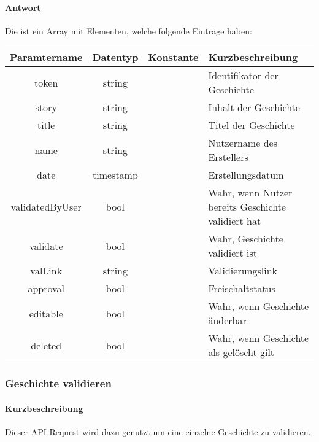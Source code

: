\paragraph{Antwort}Die ist ein Array mit Elementen, welche folgende Einträge haben:
\begin{table}[H]
	\begin{tabular}{|c|c|c|p{6.5cm}|}
		\hline
		\textbf{Paramtername} & \textbf{Datentyp} & \textbf{Konstante} & \textbf{Kurzbeschreibung}            \\ \hline                
		token              & string            &                 & Identifikator der Geschichte \\ \hline
		story              & string            &                 & Inhalt der Geschichte \\ \hline
		title              & string            &                 & Titel der Geschichte \\ \hline
		name               & string            &                 & Nutzername des Erstellers \\ \hline
		date               & timestamp         &                 & Erstellungsdatum \\ \hline
		validatedByUser    & bool              &                 & Wahr, wenn Nutzer bereits Geschichte validiert hat \\ \hline
		validate           & bool              &                 & Wahr, Geschichte validiert ist \\ \hline
		valLink            & string            &                 & Validierungslink \\ \hline
		approval           & bool              &                 & Freischaltstatus \\ \hline
		editable           & bool              &                 & Wahr, wenn Geschichte änderbar \\ \hline
		deleted            & bool              &                 & Wahr, wenn Geschichte als gelöscht gilt \\ \hline
	\end{tabular}
\end{table}

\subsubsection{Geschichte validieren}
\paragraph{Kurzbeschreibung}Dieser API-Request wird dazu genutzt um eine einzelne Geschichte zu validieren.
